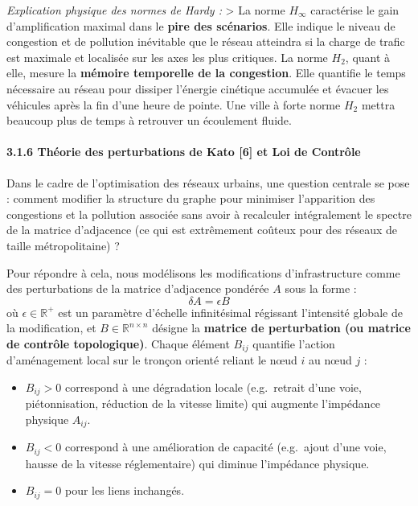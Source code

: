 \documentclass[10pt, a4paper]{article}
\providecommand{\tightlist}{}
\begin{document}
\emph{Explication physique des normes de Hardy :} \textgreater{} La
norme \(H_\infty\) caractérise le gain d'amplification maximal dans le
\textbf{pire des scénarios}. Elle indique le niveau de congestion et de
pollution inévitable que le réseau atteindra si la charge de trafic est
maximale et localisée sur les axes les plus critiques. La norme \(H_2\),
quant à elle, mesure la \textbf{mémoire temporelle de la congestion}.
Elle quantifie le temps nécessaire au réseau pour dissiper l'énergie
cinétique accumulée et évacuer les véhicules après la fin d'une heure de
pointe. Une ville à forte norme \(H_2\) mettra beaucoup plus de temps à
retrouver un écoulement fluide.

\paragraph{3.1.6 Théorie des perturbations de Kato {[}6{]} et Loi de
Contrôle}\label{thuxe9orie-des-perturbations-de-kato-6-et-loi-de-contruxf4le}

Dans le cadre de l'optimisation des réseaux urbains, une question
centrale se pose : comment modifier la structure du graphe pour
minimiser l'apparition des congestions et la pollution associée sans
avoir à recalculer intégralement le spectre de la matrice d'adjacence
(ce qui est extrêmement coûteux pour des réseaux de taille
métropolitaine) ?

Pour répondre à cela, nous modélisons les modifications d'infrastructure
comme des perturbations de la matrice d'adjacence pondérée \(A\) sous la
forme : \[\delta A = \epsilon B\] où \(\epsilon \in \mathbb{R}^+\) est
un paramètre d'échelle infinitésimal régissant l'intensité globale de la
modification, et \(B \in \mathbb{R}^{n \times n}\) désigne la
\textbf{matrice de perturbation (ou matrice de contrôle topologique)}.
Chaque élément \(B_{ij}\) quantifie l'action d'aménagement local sur le
tronçon orienté reliant le nœud \(i\) au nœud \(j\) :

\begin{itemize}
\tightlist
\item
  \(B_{ij} > 0\) correspond à une dégradation locale (e.g.~retrait d'une
  voie, piétonnisation, réduction de la vitesse limite) qui augmente
  l'impédance physique \(A_{ij}\).
\item
  \(B_{ij} < 0\) correspond à une amélioration de capacité (e.g.~ajout
  d'une voie, hausse de la vitesse réglementaire) qui diminue
  l'impédance physique.
\item
  \(B_{ij} = 0\) pour les liens inchangés.
\end{itemize}
\end{document}
